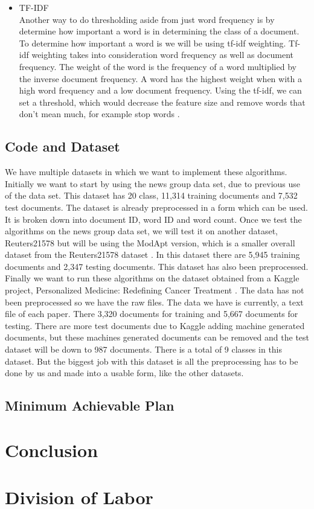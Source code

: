 \documentclass[a4paper, 11pt]{article}
\begin{document}
\begin{itemize}
	\item TF-IDF\\
	Another way to do thresholding aside from just word frequency is by determine how important a word is in determining the class of a document. To determine how important a word is we will be using tf-idf weighting. Tf-idf weighting takes into consideration word frequency as well as document frequency. The weight of the word is the frequency of a word multiplied by the inverse document frequency. A word has the highest weight when with a high word frequency and a low document frequency. Using the tf-idf, we can set a threshold, which would decrease the feature size and remove words that don’t mean much, for example stop words \cite{schutze2008introduction}.
	
\end{itemize}

\subsection{Code and Dataset}
We have multiple datasets in which we want to implement these algorithms. Initially we want to start by using the news group data set, due to previous use of the data set. This dataset has 20 class, 11,314 training documents and 7,532 test documents. The dataset is already preprocessed in a form which can be used. It is broken down into document ID, word ID and word count. Once we test the algorithms on the news group data set, we will test it on another dataset, Reuters21578 but will be using the ModApt version, which is a smaller overall dataset from the Reuters21578 dataset \cite{dataset}. In this dataset there are 5,945 training documents and 2,347 testing documents. This dataset has also been preprocessed. Finally we want to run these algorithms on the dataset obtained from a Kaggle project, Personalized Medicine: Redefining Cancer Treatment \cite{kaggledataset}. The data has not been preprocessed so we have the raw files. The data we have is currently, a text file of each paper. There 3,320 documents for training and 5,667 documents for testing. There are more test documents due to Kaggle adding machine generated documents, but these machines generated documents can be removed and the test dataset will be down to 987 documents. There is a total of 9 classes in this dataset. But the biggest job with this dataset is all the preprocessing has to be done by us and made into a usable form, like the other datasets. 

\subsection{Minimum Achievable Plan}
\section{Conclusion}
\section*{Division of Labor}
















\nocite{*}
{\small


}
\end{document}
